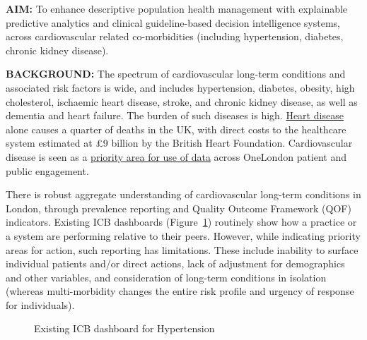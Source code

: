 \documentclass[
  letterpaper,
  DIV=11,
  numbers=noendperiod]{scrartcl}
\begin{document}
\textbf{AIM:} To enhance descriptive population health management with
explainable predictive analytics and clinical guideline-based decision
intelligence systems, across cardiovascular related co-morbidities
(including hypertension, diabetes, chronic kidney disease).

\textbf{BACKGROUND:} The spectrum of cardiovascular long-term conditions
and associated risk factors is wide, and includes hypertension,
diabetes, obesity, high cholesterol, ischaemic heart disease, stroke,
and chronic kidney disease, as well as dementia and heart failure. The
burden of such diseases is high.
\href{https://cks.nice.org.uk/topics/cvd-risk-assessment-management/background-information/burden-of-cvd/}{Heart
disease} alone causes a quarter of deaths in the UK, with direct costs
to the healthcare system estimated at £9 billion by the British Heart
Foundation. Cardiovascular disease is seen as a
\href{https://imperialcollegehealthpartners.com/portfolio/onelondon/}{priority
area for use of data} across OneLondon patient and public engagement.

There is robust aggregate understanding of cardiovascular long-term
conditions in London, through prevalence reporting and Quality Outcome
Framework (QOF) indicators. Existing ICB dashboards
(Figure~\ref{fig-icb-hypertension}) routinely show how a practice or a
system are performing relative to their peers. However, while indicating
priority areas for action, such reporting has limitations. These include
inability to surface individual patients and/or direct actions, lack of
adjustment for demographics and other variables, and consideration of
long-term conditions in isolation (whereas multi-morbidity changes the
entire risk profile and urgency of response for individuals).

\begin{figure}


\caption{\label{fig-icb-hypertension}Existing ICB dashboard for
Hypertension}

\end{figure}%
\end{document}
